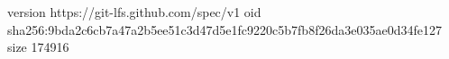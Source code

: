 version https://git-lfs.github.com/spec/v1
oid sha256:9bda2c6cb7a47a2b5ee51c3d47d5e1fc9220c5b7fb8f26da3e035ae0d34fe127
size 174916
